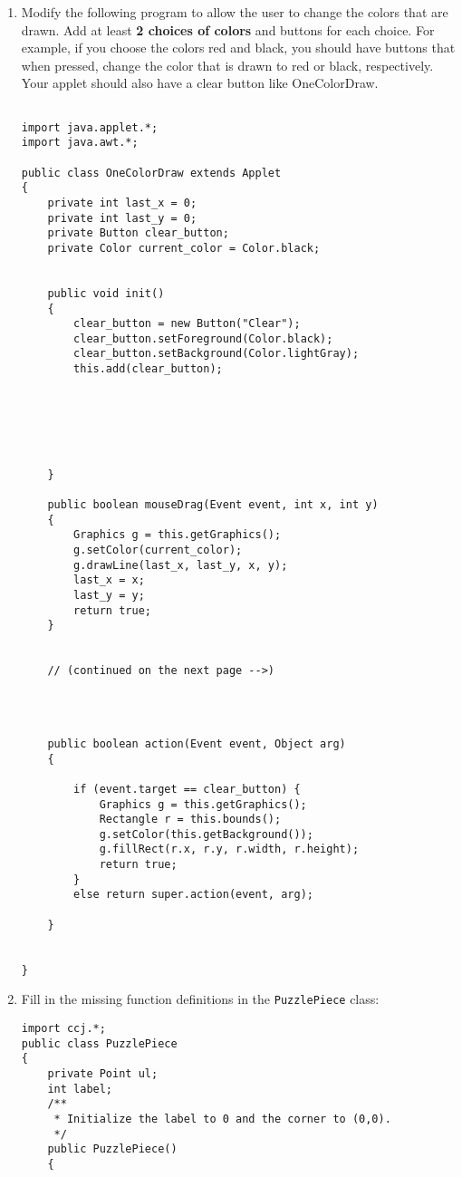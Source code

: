 \begin{enumerate}
    \item Modify the following program to allow the user to change 
	the colors that are drawn.   Add at least {\bf 2 choices of colors} and
    	buttons for each choice. For example, if you choose the colors 
	red and black, you should have buttons that when pressed,
    	change the color that is drawn to red or black, respectively. 
	Your applet should also have a clear button like OneColorDraw.
\begin{verbatim}

import java.applet.*;   
import java.awt.*;     

public class OneColorDraw extends Applet 
{
    private int last_x = 0;     
    private int last_y = 0;    
    private Button clear_button;
    private Color current_color = Color.black;  

    
    public void init() 
    {
        clear_button = new Button("Clear");
        clear_button.setForeground(Color.black);
        clear_button.setBackground(Color.lightGray);
        this.add(clear_button);           






    }

    public boolean mouseDrag(Event event, int x, int y)
    {
        Graphics g = this.getGraphics(); 
        g.setColor(current_color);      
        g.drawLine(last_x, last_y, x, y);
        last_x = x;     
        last_y = y;    
        return true;  
    }


    // (continued on the next page -->)
\end{verbatim}
\begin{verbatim}


    
    public boolean action(Event event, Object arg) 
    {

        if (event.target == clear_button) {
            Graphics g = this.getGraphics();
            Rectangle r = this.bounds();
            g.setColor(this.getBackground());
            g.fillRect(r.x, r.y, r.width, r.height);
            return true;
        }
        else return super.action(event, arg);

    }


}
\end{verbatim}

    \item Fill in the missing function definitions in the {\tt PuzzlePiece}
	class:
\begin{verbatim}import ccj.*;
public class PuzzlePiece 
{   
    private Point ul;
    int label;
    /**
     * Initialize the label to 0 and the corner to (0,0).
     */
    public PuzzlePiece()
    {





\end{verbatim}
\end{enumerate}
